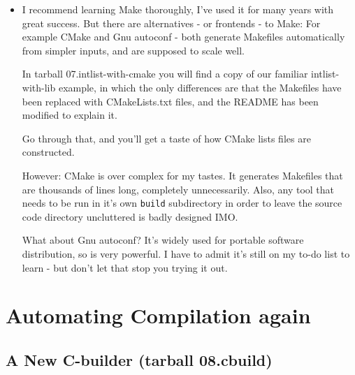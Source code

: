 \documentclass[handout]{beamer}
\begin{document}
\begin{frame}[fragile]

    \begin{itemize}
      \item
        I recommend learning Make thoroughly, I've used it for many years
	with great success.
      \pitem
	But there are alternatives - or frontends - to Make:
	For example \alert{CMake} and \alert{Gnu autoconf} -
	both generate \alert{Makefiles} automatically from simpler
	inputs, and are supposed to scale well.

      \pitem
      In tarball \alert{07.intlist-with-cmake} you will find a copy of our
      familiar intlist-with-lib example, in which the \alert{only}
      differences are that the Makefiles have been replaced with
      CMakeLists.txt files, and the README has been modified to explain it.

      \pitem
      Go through that, and you'll get a taste of how CMake lists files
      are constructed.
      
      \pitem
      However: CMake is over complex for my tastes.  It generates Makefiles that
      are thousands of lines long, completely unnecessarily.
      Also, any tool that needs to be run in it's own \verb+build+
      subdirectory in order to leave the source code directory uncluttered
      is badly designed IMO.

      \pitem
      What about \alert{Gnu autoconf}?  It's widely used for portable software distribution,
      so is very powerful.  I have to admit it's still on my to-do list to learn - but don't
      let that stop you trying it out.

    \end{itemize}

\end{frame}

\section{Automating Compilation again}
\subsection{A New C-builder (tarball 08.cbuild)}
\end{document}
